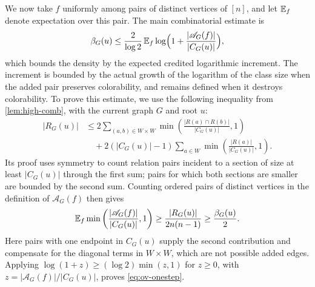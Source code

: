We now take $f$ uniformly among pairs of distinct vertices of $[n]$, and let $\mathbb E_f$ denote expectation over this pair. The main combinatorial estimate is
\begin{equation}\label{eq:ov-onestep}
\beta_G(u) \le \frac{2}{\log 2} \, \mathbb E_f \log\Bigl(1 + \frac{|\mathscr A_G(f)|}{|C_G(u)|}\Bigr),
\end{equation}
which bounds the density by the expected credited logarithmic increment. The increment is bounded by the actual growth of the logarithm of the class size when the added pair preserves colorability, and remains defined when it destroys colorability.
To prove this estimate, we use the following inequality from \cref{lem:high-comb}, with the current graph $G$ and root $u$:
\[
\begin{aligned}
|R_G(u)| &\le
2\sum_{(a, b) \in W \times W}\min\left(\frac{|R(a) \cap R(b)|}{|C_G(u)|}, 1\right)\\
&\quad + 2(|C_G(u)| - 1)\sum_{a \in W}\min\left(\frac{|R(a)|}{|C_G(u)|}, 1\right).
\end{aligned}
\]
Its proof uses symmetry to count relation pairs incident to a section of size at least $|C_G(u)|$ through the first sum; pairs for which both sections are smaller are bounded by the second sum. Counting ordered pairs of distinct vertices in the definition of $\mathscr A_G(f)$ then gives
\[
\mathbb E_f\min\left(\frac{|\mathscr A_G(f)|}{|C_G(u)|}, 1\right)
\ge \frac{|R_G(u)|}{2n(n - 1)} \ge \frac{\beta_G(u)}2.
\]
Here pairs with one endpoint in $C_G(u)$ supply the second contribution and compensate for the diagonal terms in $W \times W$, which are not possible added edges. Applying $\log(1 + z) \ge (\log 2)\min(z, 1)$ for $z \ge 0$, with $z = |\mathscr A_G(f)|/|C_G(u)|$, proves \eqref{eq:ov-onestep}.

